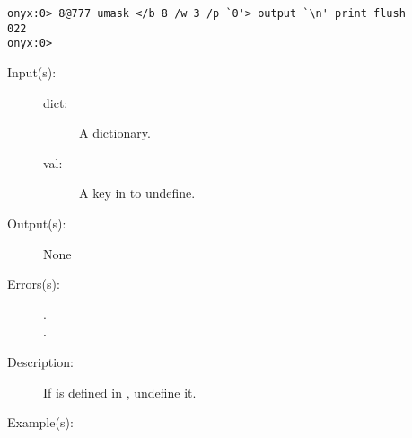 \begin{description}
\begin{description}
\begin{verbatim}
onyx:0> 8@777 umask </b 8 /w 3 /p `0'> output `\n' print flush
022
onyx:0>
		\end{verbatim}
	\end{description}
\label{systemdict:undef}
\item[{\onyxop{dict key}{undef}{--}}: ]
	\begin{description}\item[]
	\item[Input(s): ]
		\begin{description}\item[]
		\item[dict: ]
			A dictionary.
		\item[val: ]
			A key in  to undefine.
		\end{description}
	\item[Output(s): ] None
	\item[Errors(s): ]
		\begin{description}\item[]
		\item[.]
		\item[.]
		\end{description}
	\item[Description: ]
		If  is defined in , undefine it.
	\item[Example(s): ]\begin{verbatim}


\end{verbatim}
\end{description}
\end{description}

